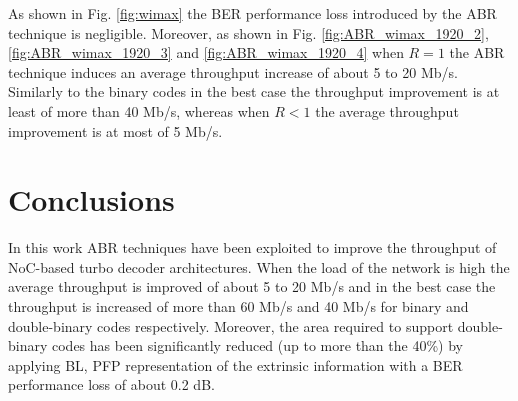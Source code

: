 \documentclass[10pt,twocolumn,journal]{IEEEtran}
\begin{document}
As shown in Fig. \ref{fig:wimax} the BER performance loss introduced by the ABR technique is negligible. 
Moreover, as shown in Fig. \ref{fig:ABR_wimax_1920_2}, \ref{fig:ABR_wimax_1920_3} and \ref{fig:ABR_wimax_1920_4} 
when $R=1$ the ABR technique induces an average throughput increase of about 5 to 20 Mb/s. 
Similarly to the binary codes in the best case the throughput improvement is at least of more than 40 Mb/s, whereas 
when $R<1$ the average throughput improvement is at most of 5 Mb/s.

\section{Conclusions}
\label{sec:concl}
In this work ABR techniques have been exploited to improve the throughput of NoC-based turbo decoder architectures. 
When the load of the network is high the average throughput is improved of about 5 to 20 Mb/s and in the best case 
the throughput is increased of more than 60 Mb/s and 40 Mb/s for binary and double-binary codes respectively. 
Moreover, the area required to support double-binary codes has been 
significantly reduced (up to more than the 40\%) by applying BL, PFP representation of the extrinsic information with 
a BER performance loss of about 0.2 dB.



\end{document}
